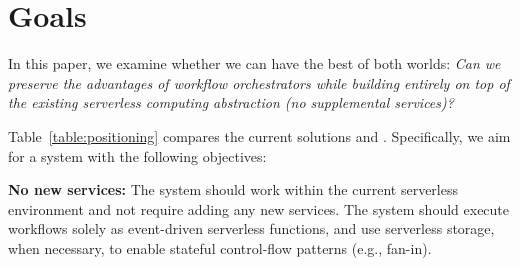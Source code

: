 

\section{Goals}\label{sec:goals}
In this paper, we examine whether we can have the best of both worlds:
\emph{Can we preserve the advantages of workflow orchestrators while building
entirely on top of the existing serverless computing abstraction (no
supplemental services)?}

Table~\ref{table:positioning} compares the current solutions and \name{}.
Specifically, we aim for a system with the following objectives:

\squishlist

    \item \textbf{No new services: } The system should work within the
    current serverless environment and not require adding any new services.
    The system should execute workflows solely as event-driven serverless
    functions, and use serverless storage, when necessary, to enable stateful
    control-flow patterns (e.g., fan-in).

